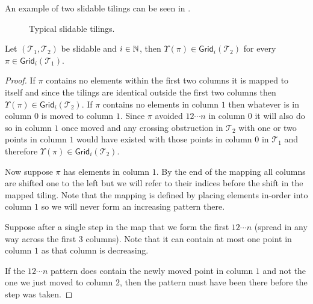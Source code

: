 \begin{definition}
\begin{itemize}
\end{itemize}
\end{definition}

An example of two slidable tilings can be seen in .

\begin{figure}[ht]
    \centering
    
    \caption{Typical slidable tilings.}
    \label{fig:slidable_tilings}
\end{figure}

\begin{lemma}\label{lem:slidemap}
Let $(\mathcal{T}_1,\mathcal{T}_2)$ be slidable and $i \in \mathbb{N}$, then $\Upsilon(\pi) \in \textsf{Grid}_i(\mathcal{T}_2)$ for every $\pi \in \textsf{Grid}_i(\mathcal{T}_1)$.
\end{lemma}
\begin{proof}
If $\pi$ contains no elements within the first two columns it is mapped to itself and since the tilings are identical outside the first two columns then $\Upsilon(\pi) \in \textsf{Grid}_i(\mathcal{T}_2)$. If $\pi$ contains no elements in column $1$ then whatever is in column $0$ is moved to column $1$. Since $\pi$ avoided $12\dotsm n$ in column $0$ it will also do so in column $1$ once moved and any crossing obstruction in $\mathcal{T}_2$ with one or two points in column $1$ would have existed with those points in column $0$ in $\mathcal{T}_1$ and therefore $\Upsilon(\pi) \in \textsf{Grid}_i(\mathcal{T}_2)$.

Now suppose $\pi$ has elements in column $1$. By the end of the mapping all columns are shifted one to the left but we will refer to their indices before the shift in the mapped tiling. Note that the mapping is defined by placing elements in-order into column $1$ so we will never form an increasing pattern there. 

Suppose after a single step in the map that we form the first $12\cdots n$ (spread in any way across the first $3$ columns). Note that it can contain at most one point in column $1$ as that column is decreasing.

If the $12\cdots n$ pattern does contain the newly moved point in column $1$ and not the one we just moved to column $2$, then the pattern must have been there before the step was taken.


\end{proof}
